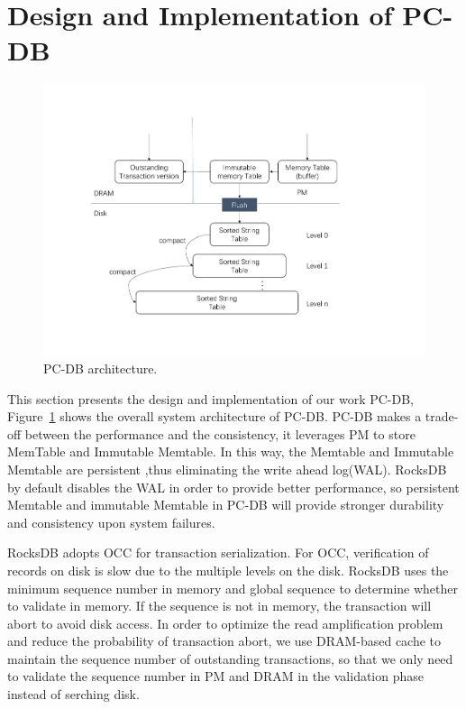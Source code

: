 \section{Design and Implementation of PC-DB}

    \begin{figure}
        \centering
        \includegraphics[width=0.36\paperwidth]{figure/structure.pdf}
        \caption{PC-DB architecture.}
        \label{fig:structure}
    \end{figure}
This section presents the design and implementation of our work PC-DB, Figure~\ref{fig:structure} shows the overall system architecture of PC-DB. PC-DB makes a trade-off between the performance and the consistency, it leverages PM to store MemTable and Immutable Memtable. 
In this way, the Memtable and Immutable Memtable are persistent ,thus eliminating the write ahead log(WAL). 
RocksDB ~\cite{RocksDB} by default disables the WAL in order to provide better performance, 
so persistent Memtable and immutable Memtable in PC-DB will provide stronger durability and consistency upon system failures.

RocksDB adopts OCC for transaction serialization.
For OCC, verification of records on disk is slow due to the multiple levels on the disk. 
RocksDB uses the minimum sequence number in memory and global sequence to determine whether to validate in memory. 
If the sequence is not in memory, the transaction will abort to avoid disk access.
In order to optimize the read amplification problem and reduce the probability of transaction abort, 
we use DRAM-based cache to maintain the sequence number of outstanding transactions, 
so that we only need to validate the sequence number in PM and DRAM in the validation phase instead of serching disk.




